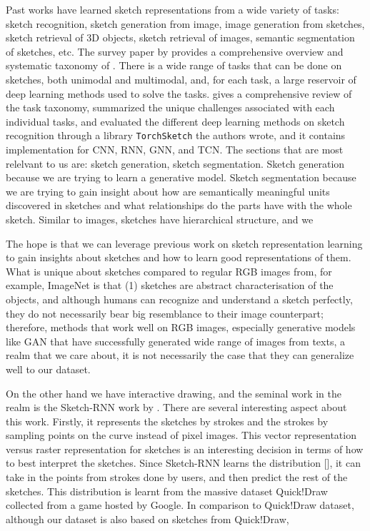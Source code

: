 Past works have learned sketch representations from a wide variety of tasks: sketch recognition, sketch generation from image, image generation from sketches, sketch retrieval of 3D objects, sketch retrieval of images, semantic segmentation of sketches, etc. 
The survey paper by \citet{sketchsurvey} provides a comprehensive overview and systematic taxonomy of . 
There is a wide range of tasks that can be done on sketches, both unimodal and multimodal, and, for each task, a large reservoir of deep learning methods used to solve the tasks. 
\citet{sketchsurvey} gives a comprehensive review of the task taxonomy, summarized the unique challenges associated with each individual tasks, and evaluated the different deep learning methods on sketch recognition through a library \texttt{TorchSketch} the authors wrote, and it contains implementation for CNN, RNN, GNN, and TCN. The sections that are most relelvant to us are: sketch generation, sketch segmentation. Sketch generation because we are trying to learn a generative model. Sketch segmentation because we are trying to gain insight about how are semantically meaningful units discovered in sketches and what relationships do the parts have with the whole sketch.      
Similar to images, sketches have hierarchical structure, and we 

The hope is that we can leverage previous work on sketch representation learning to gain insights about sketches and how to learn good representations of them. What is unique about sketches compared to regular RGB images from, for example, ImageNet is that (1) sketches are abstract characterisation of the objects, and although humans can recognize and understand a sketch perfectly, they do not necessarily bear big resemblance to their image counterpart; therefore, methods that work well on RGB images, especially generative models like GAN that have successfully generated wide range of images from texts, a realm that we care about, it is not necessarily the case that they can generalize well to our dataset.  

On the other hand we have interactive drawing, and the seminal work in the realm is the Sketch-RNN work by \citep{ha2017neural}. There are several interesting aspect about this work. Firstly, it represents the sketches by strokes and the strokes by sampling points on the curve instead of pixel images. This vector representation versus raster representation for sketches is an interesting decision in terms of how to best interpret the sketches. Since Sketch-RNN learns the distribution [], it can take in the points from strokes done by users, and then predict the rest of the sketches. This distribution is learnt from the massive dataset Quick!Draw collected from a game hosted by Google. In comparison to Quick!Draw dataset, although our dataset is also based on sketches from Quick!Draw,     



